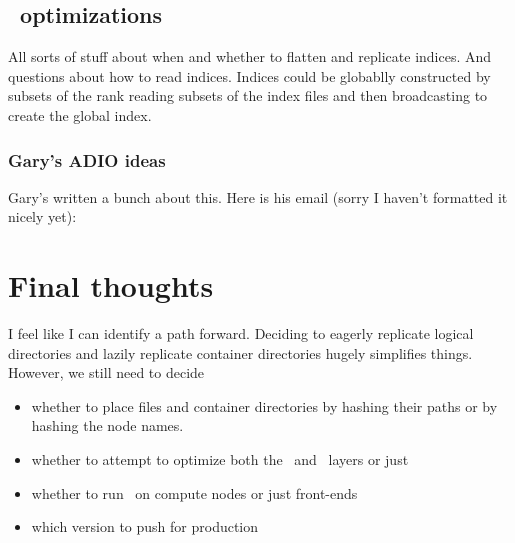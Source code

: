\documentclass[10pt]{article}
\begin{document}
\subsection{\adio\ optimizations}
\label{sec-adio-opt}

All sorts of stuff about when and whether to flatten and replicate indices.
And questions about how to read indices.  Indices could be globablly
constructed by subsets of the rank reading subsets of the index files and then
broadcasting to create the global index.  

\subsubsection{Gary's ADIO ideas}
Gary's written a bunch about this.
Here is his email (sorry I haven't formatted it nicely yet):




\section{Final thoughts}

I feel like I can identify a path forward.  Deciding to eagerly replicate
logical directories and lazily replicate container directories hugely
simplifies things.  However, we still need to decide 

\begin{itemize}
\item{whether to place files and 
container directories by hashing their paths or by hashing the node names.  
}
\item{whether to attempt to optimize both the \adio\ and \fuse\ layers or
just \adio}
\item{whether to run \fuse\ on compute nodes or just front-ends}
\item{which version to push for production}
\end{itemize}
\end{document}
